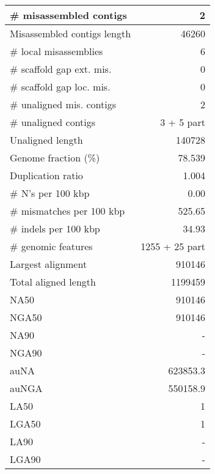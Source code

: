 \documentclass[12pt,a4paper]{article}
\begin{document}
\begin{table}[ht]
\begin{center}
\begin{tabular}{|l*{1}{|r}|}
\# misassembled contigs & 2 \\ \hline
Misassembled contigs length & 46260 \\ \hline
\# local misassemblies & 6 \\ \hline
\# scaffold gap ext. mis. & 0 \\ \hline
\# scaffold gap loc. mis. & 0 \\ \hline
\# unaligned mis. contigs & 2 \\ \hline
\# unaligned contigs & 3 + 5 part \\ \hline
Unaligned length & 140728 \\ \hline
Genome fraction (\%) & 78.539 \\ \hline
Duplication ratio & 1.004 \\ \hline
\# N's per 100 kbp & 0.00 \\ \hline
\# mismatches per 100 kbp & 525.65 \\ \hline
\# indels per 100 kbp & 34.93 \\ \hline
\# genomic features & 1255 + 25 part \\ \hline
Largest alignment & 910146 \\ \hline
Total aligned length & 1199459 \\ \hline
NA50 & 910146 \\ \hline
NGA50 & 910146 \\ \hline
NA90 & - \\ \hline
NGA90 & - \\ \hline
auNA & 623853.3 \\ \hline
auNGA & 550158.9 \\ \hline
LA50 & 1 \\ \hline
LGA50 & 1 \\ \hline
LA90 & - \\ \hline
LGA90 & - \\ \hline
\end{tabular}
\end{center}
\end{table}
\end{document}

